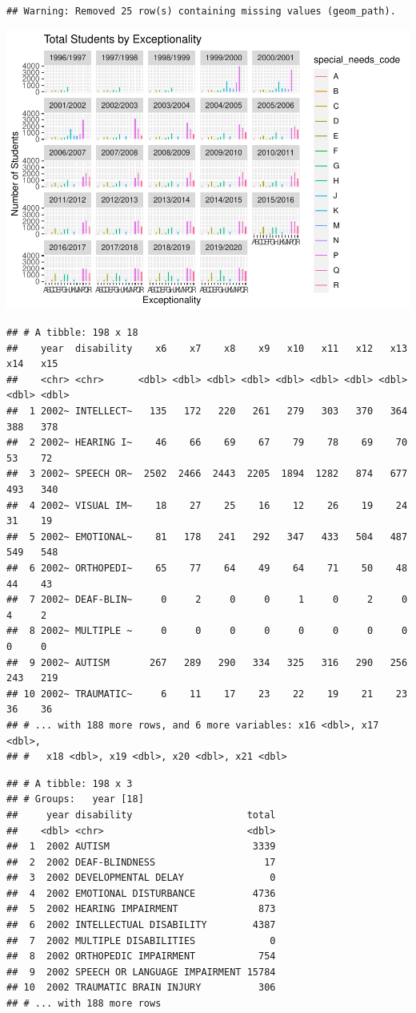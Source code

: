 \documentclass[
  english,
  man]{apa6}
\begin{document}
\begin{verbatim}
## Warning: Removed 25 row(s) containing missing values (geom_path).
\end{verbatim}

\includegraphics{draft_play_files/figure-latex/urban play-2.pdf}

\begin{verbatim}
## # A tibble: 198 x 18
##    year  disability    x6    x7    x8    x9   x10   x11   x12   x13   x14   x15
##    <chr> <chr>      <dbl> <dbl> <dbl> <dbl> <dbl> <dbl> <dbl> <dbl> <dbl> <dbl>
##  1 2002~ INTELLECT~   135   172   220   261   279   303   370   364   388   378
##  2 2002~ HEARING I~    46    66    69    67    79    78    69    70    53    72
##  3 2002~ SPEECH OR~  2502  2466  2443  2205  1894  1282   874   677   493   340
##  4 2002~ VISUAL IM~    18    27    25    16    12    26    19    24    31    19
##  5 2002~ EMOTIONAL~    81   178   241   292   347   433   504   487   549   548
##  6 2002~ ORTHOPEDI~    65    77    64    49    64    71    50    48    44    43
##  7 2002~ DEAF-BLIN~     0     2     0     0     1     0     2     0     4     2
##  8 2002~ MULTIPLE ~     0     0     0     0     0     0     0     0     0     0
##  9 2002~ AUTISM       267   289   290   334   325   316   290   256   243   219
## 10 2002~ TRAUMATIC~     6    11    17    23    22    19    21    23    36    36
## # ... with 188 more rows, and 6 more variables: x16 <dbl>, x17 <dbl>,
## #   x18 <dbl>, x19 <dbl>, x20 <dbl>, x21 <dbl>
\end{verbatim}

\begin{verbatim}
## # A tibble: 198 x 3
## # Groups:   year [18]
##     year disability                    total
##    <dbl> <chr>                         <dbl>
##  1  2002 AUTISM                         3339
##  2  2002 DEAF-BLINDNESS                   17
##  3  2002 DEVELOPMENTAL DELAY               0
##  4  2002 EMOTIONAL DISTURBANCE          4736
##  5  2002 HEARING IMPAIRMENT              873
##  6  2002 INTELLECTUAL DISABILITY        4387
##  7  2002 MULTIPLE DISABILITIES             0
##  8  2002 ORTHOPEDIC IMPAIRMENT           754
##  9  2002 SPEECH OR LANGUAGE IMPAIRMENT 15784
## 10  2002 TRAUMATIC BRAIN INJURY          306
## # ... with 188 more rows
\end{verbatim}
\end{document}
